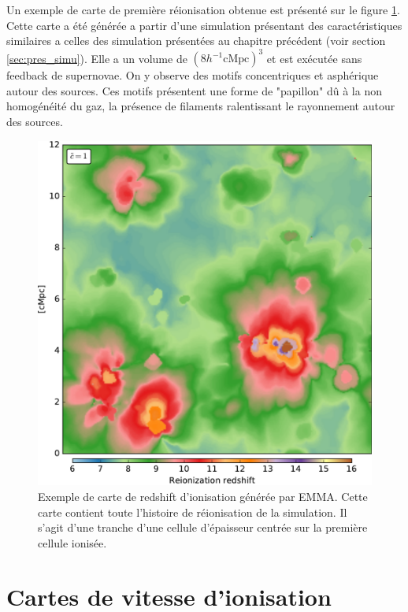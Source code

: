 Un exemple de carte de première réionisation obtenue est présenté sur le figure \ref{fig:zmap}.
Cette carte a été générée a partir d'une simulation présentant des caractéristiques similaires a celles des simulation présentées au chapitre précédent (voir section \ref{sec:pres_simu}).
Elle a un volume de $\left( 8h^{-1} \mathrm{cMpc} \right) ^3$ et est exécutée sans feedback de supernovae. 
On y observe des motifs concentriques et asphérique autour des sources. 
Ces motifs présentent une forme de "papillon" dû à la non homogénéité du gaz, la présence de filaments ralentissant le rayonnement autour des sources.

\begin{figure}
        \includegraphics[width=.95\linewidth]{img/04_mapreio/map_z_c1.pdf} 
        \caption[Carte de redshift d'ionisation]{Exemple de carte de redshift d'ionisation générée par EMMA.
        Cette carte contient toute l'histoire de réionisation de la simulation.
        Il s'agit d'une tranche d'une cellule d'épaisseur centrée sur la première cellule ionisée.
 		\label{fig:zmap}}
\end{figure}

\clearpage
\section{Cartes de vitesse d’ionisation}

